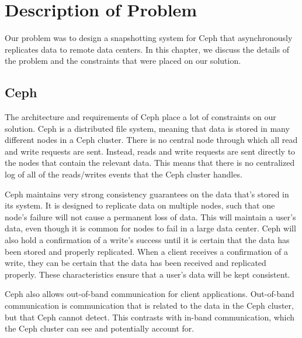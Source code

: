 \chapter{Description of Problem}
\label{sec:description}

Our problem was to design a snapshotting system for Ceph that asynchronously
replicates data to remote data centers. In this chapter, we discuss the details
of the problem and the constraints that were placed on our solution. 

\section{Ceph}

The architecture and requirements of Ceph place a lot of constraints on our
solution. Ceph is a distributed file system, meaning that data is stored in
many different nodes in a Ceph cluster. There
is no central node through which all read and write requests are sent. 
Instead, reads and write requests are sent directly to the nodes that contain
the relevant data. This means that there is no centralized log of all of the
reads/writes events that the Ceph cluster handles.

Ceph maintains very strong consistency guarantees on the data that's 
stored in its system. It is designed to replicate data on multiple nodes, such 
that one node's failure will not cause a permanent loss of data. This will 
maintain a user's data, even though it is common for nodes to fail in a large 
data center. Ceph will also hold a
confirmation of a write's success until it is certain that the data has been 
stored and properly replicated. When a client receives a confirmation of a write, they can be certain that the data has been received and replicated properly. These characteristics ensure that a user's 
data will be kept consistent.

Ceph also allows out-of-band communication for client applications. 
Out-of-band communication is communication that is related to the data in the 
Ceph cluster, but that Ceph cannot detect. This contrasts with in-band
communication, which the Ceph cluster can see and potentially account for. 

